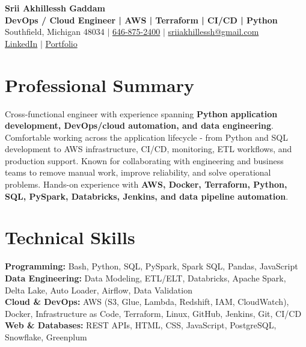 \documentclass[letterpaper,10pt]{article}
\begin{document}
\fontsize{9.35pt}{10.45pt}\selectfont

\begin{center}
    {\LARGE \textbf{Srii Akhillessh Gaddam}} \\[-1pt]
    \textbf{DevOps / Cloud Engineer | AWS | Terraform | CI/CD | Python} \\[2pt]
    Southfield, Michigan 48034 $|$
    \href{tel:6468752400}{646-875-2400} $|$
    \href{mailto:sriiakhillessh@gmail.com}{sriiakhillessh@gmail.com} \\[1pt]
    \href{https://www.linkedin.com/in/srii-akhiilessh-gaddam-b48668191/}{LinkedIn} $|$
    \href{https://sriiakhillesshg.github.io/portfolio/}{Portfolio}
\end{center}
\vspace{-8pt}

\section{Professional Summary}
\small{Cross-functional engineer with experience spanning \textbf{Python application development, DevOps/cloud automation, and data engineering}. Comfortable working across the application lifecycle - from Python and SQL development to AWS infrastructure, CI/CD, monitoring, ETL workflows, and production support. Known for collaborating with engineering and business teams to remove manual work, improve reliability, and solve operational problems. Hands-on experience with \textbf{AWS, Docker, Terraform, Python, SQL, PySpark, Databricks, Jenkins, and data pipeline automation}.}

\section{Technical Skills}
\small{
\textbf{Programming:} Bash, Python, SQL, PySpark, Spark SQL, Pandas, JavaScript \\
\textbf{Data Engineering:} Data Modeling, ETL/ELT, Databricks, Apache Spark, Delta Lake, Auto Loader, Airflow, Data Validation \\
\textbf{Cloud \& DevOps:} AWS (S3, Glue, Lambda, Redshift, IAM, CloudWatch), Docker, Infrastructure as Code, Terraform, Linux, GitHub, Jenkins, Git, CI/CD \\
\textbf{Web \& Databases:} REST APIs, HTML, CSS, JavaScript, PostgreSQL, Snowflake, Greenplum
}
\end{document}
